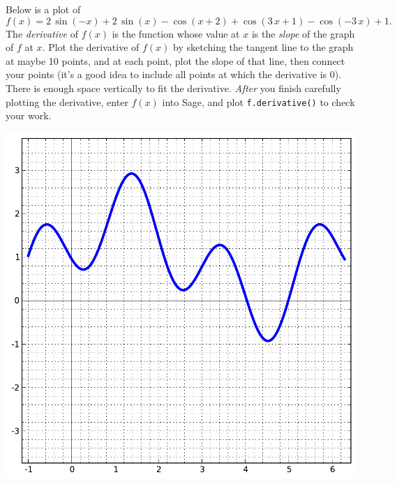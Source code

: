 Below is a plot of $$f(x)=2 \, \sin\left(-x\right) + 2 \, \sin\left(x\right) - \cos\left(x + 2\right) + \cos\left(3 \, x + 1\right) - \cos\left(-3 \, x\right) + 1.$$  The {\em \color{red}derivative} of $f(x)$ is the function whose value at $x$ is the {\em slope} of the graph of $f$ at $x$.  Plot the derivative of $f(x)$ by sketching the tangent line to the graph at maybe 10 points, and at each point, plot the slope of that line, then connect your points (it's a good idea to include all points at which the derivative is 0).  There is enough space vertically to fit the derivative.  {\em After} you finish carefully plotting the derivative, enter $f(x)$ into Sage, and plot {\color{blue}\verb|f.derivative()|} to check your work.
\begin{center}\includegraphics{functions/51.pdf}\end{center}\newpage

